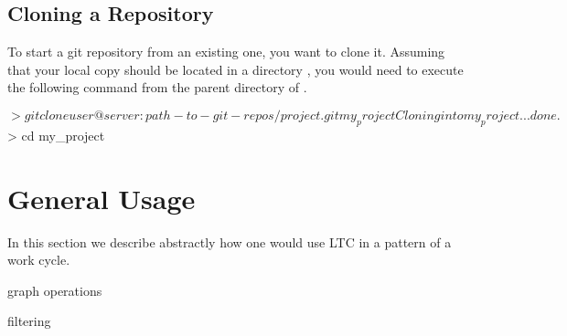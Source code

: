 \subsection{Cloning a Repository}

To start a git repository from an existing one, you want to clone it.  Assuming that your local copy should be located in a directory , you would need to execute the following command from the parent directory of .
\begin{CodeVerbatim}
$> git clone user@server:path-to-git-repos/project.git my_project
Cloning into my_project...
done.
$> cd my_project
\end{CodeVerbatim}

\section{General Usage} \label{sec:general-use}

In this section we describe abstractly how one would use LTC in a pattern of a work cycle. %

graph operations

filtering




